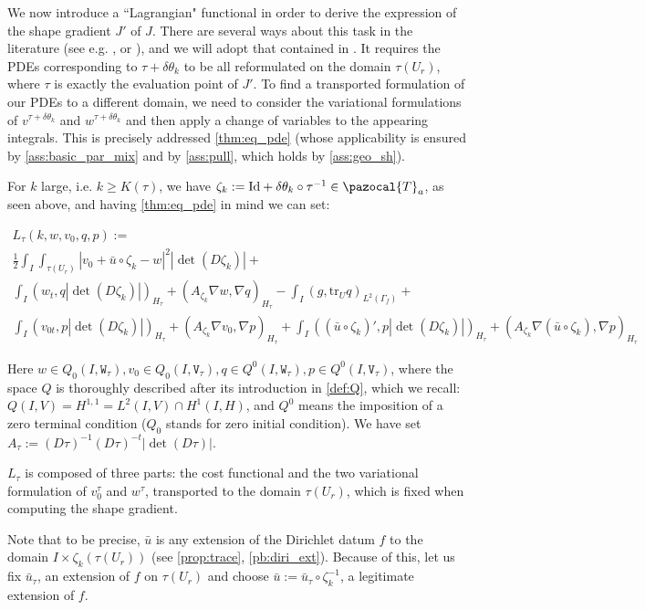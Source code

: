 \documentclass[english,a4paper,9pt,oneside]{scrbook}	%
\theoremstyle{break}
\theoremstyle{remark}
\newcommand{\tr}{\text{tr}}
\newcommand{\cT}{\pazocal{T}}
\newcommand{\id}{\text{Id}}
\newcommand{\te}{\theta}
\newcommand{\tw}[1]{\texttt{#1}}
\begin{document}
We now introduce a ``Lagrangian" functional in order to derive the expression of the shape gradient $J'$ of $J$. There are several ways about this task in the literature (see e.g. \cite{avg_adj}, \cite{cea} or \cite{lindemann}), and we will adopt that contained in \cite{avg_adj}. It requires the PDEs corresponding to $\tau + \delta \te_k$ to be all reformulated on the domain $\tau(U_r)$, where $\tau$ is exactly the evaluation point of $J'$. To find a transported formulation of our PDEs to a different domain, we need to consider the variational formulations of $v^{\tau + \delta \te_k}$ and $w^{\tau+\delta \te_k}$ and then apply a change of variables to the appearing integrals. This is precisely addressed \cref{thm:eq_pde} (whose applicability is ensured by \cref{ass:basic_par_mix} and by \cref{ass:pull}, which holds by \cref{ass:geo_sh}).

For $k$ large, i.e. $k\geq K(\tau)$, we have $\zeta_k:=\id+\delta\te_k \circ \tau^{-1} \in \cT_a$, as seen above, and  having \cref{thm:eq_pde} in mind we can set:

\begin{align*}
L_\tau(k,w,v_0,q,p) := \\
\frac{1}{2}\int_I \int_{\tau(U_r)}|v_0+\bar{u} \circ \zeta_k - w|^2|\det(D\zeta_k)|+\\
\int_I ( w_t , q |\det(D\zeta_k)|)_{H_\tau}+ (A_{\zeta_k}\nabla w, \nabla q)_{H_\tau} -\int_I(g,\tr_{U} q)_{L^2(\Gamma_f)} +\\ \int_I (v_{0t},p |\det(D\zeta_k)|)_{H_\tau} + (A_{\zeta_k} \nabla v_0, \nabla p)_{H_\tau}+\int_I((\bar{u}\circ \zeta_k)',p|\det(D\zeta_k)|)_{H_\tau}+(A_{\zeta_k} \nabla (\bar{u} \circ \zeta_k), \nabla p)_{H_\tau}
\end{align*}

Here $w \in Q_0(I, \tw{W}_\tau), v_0 \in Q_0(I,\tw{V}_\tau), q \in Q^0(I, \tw{W}_\tau), p \in Q^0(I, \tw{V}_\tau)$, where the space $Q$ is thoroughly described after its introduction in \cref{def:Q}, which we recall: $Q(I,V)=H^{1,1}=L^2(I,V)\cap H^1(I,H)$, and $Q^0$ means the imposition of a zero terminal condition ($Q_0$ stands for zero initial condition). We have set $A_\tau:=  (D\tau)^{-1}(D\tau)^{-t}|\det(D\tau)|$.

$L_\tau$ is composed of three parts: the cost functional and the two variational formulation of $v_0^\tau$ and $w^\tau$, transported to the domain $\tau(U_r)$, which is fixed when computing the shape gradient.

Note that to be precise, $\bar{u}$ is any extension of the Dirichlet datum $f$ to the domain $I \times \zeta_k(\tau(U_r))$ (see \cref{prop:trace}, \cref{pb:diri_ext}). Because of this, let us fix $\bar{u}_\tau$, an extension of $f$ on $\tau(U_r)$ and choose $\bar{u}:=\bar{u}_\tau\circ \zeta_k^{-1}$, a legitimate extension of $f$.
\end{document}
